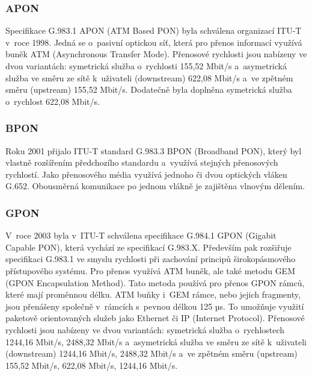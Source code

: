 \subsubsection{APON}
Specifikace G.983.1 APON (ATM Based PON) byla schválena organizací ITU-T v~roce 1998. Jedná se o~pasivní optickou síť, která pro přenos informací využívá buněk ATM (Asynchronous Transfer Mode). Přenosové rychlosti jsou nabízeny ve dvou variantách: symetrická služba o~rychlosti 155,52 Mbit/s a~asymetrická služba ve směru ze sítě k~uživateli (downstream) 622,08 Mbit/s a~ve zpětném směru (upstream) 155,52 Mbit/s. Dodatečně byla doplněna symetrická služba o~rychlost 622,08 Mbit/s.

\subsubsection{BPON}
Roku 2001 přijalo ITU-T standard G.983.3 BPON (Broadband PON), který byl vlastně rozšířením předchozího standardu a~využívá stejných přenosových rychlostí. Jako přenosového média využívá jednoho či dvou optických vláken G.652. Obousměrná komunikace po jednom vlákně je zajištěna vlnovým dělením.

\subsubsection{GPON}
V~roce 2003 byla v~ITU-T schválena specifikace G.984.1 GPON (Gigabit Capable PON), která vychází ze specifikací G.983.X. Především pak rozšiřuje specifikaci G.983.1 ve smyslu rychlosti při zachování principů širokopásmového přístupového systému. Pro přenos využívá ATM buněk, ale také metodu GEM (GPON Encapsulation Method). Tato metoda používá pro přenos GPON rámců, které mají proměnnou délku. ATM buňky i~GEM rámce, nebo jejich fragmenty, jsou přenášeny společně v~rámcích s~pevnou délkou 125 µs. To umožňuje využití paketově orientovaných služeb jako Ethernet či IP (Internet Protocol). Přenosové rychlosti jsou nabízeny ve dvou variantách: symetrická služba o~rychlostech 1244,16 Mbit/s, 2488,32 Mbit/s a~asymetrická služba ve směru ze sítě k~uživateli (downstream) 1244,16 Mbit/s, 2488,32 Mbit/s a~ve zpětném směru (upstream) 155,52 Mbit/s, 622,08 Mbit/s, 1244,16 Mbit/s.

